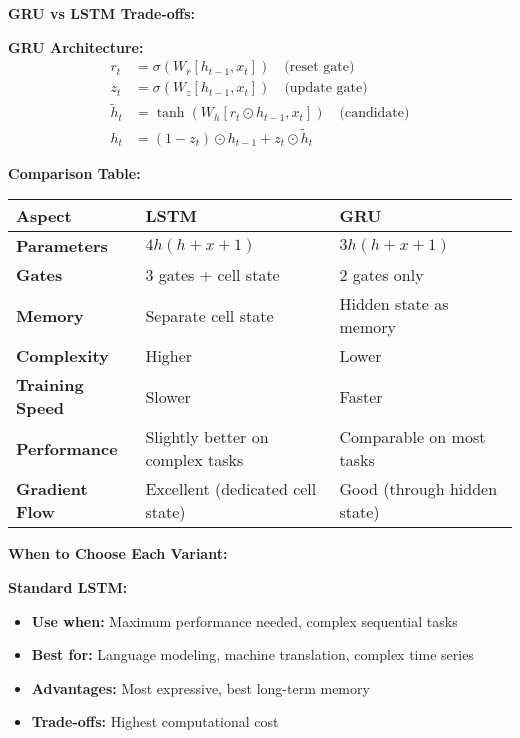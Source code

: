 \documentclass[12pt]{article}
\begin{document}
\begin{enumerate}[(a)]
{    \textbf{GRU vs LSTM Trade-offs:}
    
    \textbf{GRU Architecture:}
    \begin{align}
    r_t &= \sigma(W_r [h_{t-1}, x_t]) \quad \text{(reset gate)} \\
    z_t &= \sigma(W_z [h_{t-1}, x_t]) \quad \text{(update gate)} \\
    \tilde{h}_t &= \tanh(W_h [r_t \odot h_{t-1}, x_t]) \quad \text{(candidate)} \\
    h_t &= (1-z_t) \odot h_{t-1} + z_t \odot \tilde{h}_t
    \end{align}
    
    \textbf{Comparison Table:}
    
    \begin{tabular}{|p{3cm}|p{4cm}|p{4cm}|}
    \hline
    \textbf{Aspect} & \textbf{LSTM} & \textbf{GRU} \\
    \hline
    \textbf{Parameters} & $4h(h+x+1)$ & $3h(h+x+1)$ \\
    \hline
    \textbf{Gates} & 3 gates + cell state & 2 gates only \\
    \hline
    \textbf{Memory} & Separate cell state & Hidden state as memory \\
    \hline
    \textbf{Complexity} & Higher & Lower \\
    \hline
    \textbf{Training Speed} & Slower & Faster \\
    \hline
    \textbf{Performance} & Slightly better on complex tasks & Comparable on most tasks \\
    \hline
    \textbf{Gradient Flow} & Excellent (dedicated cell state) & Good (through hidden state) \\
    \hline
    \end{tabular}
    
    \textbf{When to Choose Each Variant:}
    
    \textbf{Standard LSTM:}
    \begin{itemize}
        \item \textbf{Use when:} Maximum performance needed, complex sequential tasks
        \item \textbf{Best for:} Language modeling, machine translation, complex time series
        \item \textbf{Advantages:} Most expressive, best long-term memory
        \item \textbf{Trade-offs:} Highest computational cost
    \end{itemize}
    
}
\end{enumerate}
\end{document}
